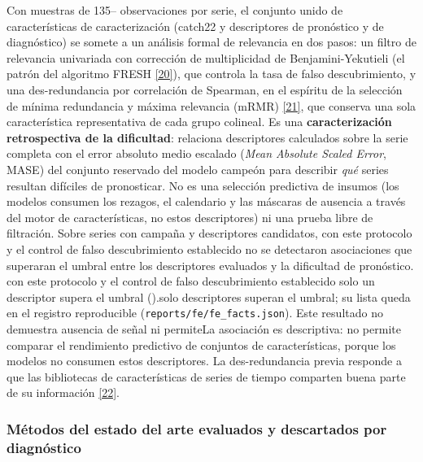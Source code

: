 \documentclass[12pt,letterpaper]{report}
\newcommand{\cita}[1]{\hyperref[bib:#1]{[#1]}}
\begin{document}
Con muestras de 135--\factNMonths{} observaciones por serie, el conjunto unido de
características de caracterización (catch22 y descriptores de pronóstico y de diagnóstico) se
somete a un análisis formal de relevancia en dos pasos: un filtro de relevancia univariada con
corrección de multiplicidad de Benjamini-Yekutieli (el patrón del algoritmo FRESH \cita{20}), que
controla la tasa de falso descubrimiento, y una des-redundancia por correlación de Spearman, en el
espíritu de la selección de mínima redundancia y máxima relevancia (mRMR) \cita{21}, que conserva
una sola característica representativa de cada grupo colineal. Es una \textbf{caracterización
retrospectiva de la dificultad}: relaciona descriptores calculados sobre la serie completa con el
error absoluto medio escalado (\textit{Mean Absolute Scaled Error}, MASE) del conjunto reservado
del modelo campeón para describir \textit{qué} series resultan difíciles de pronosticar. No es una
selección predictiva de insumos (los modelos consumen los rezagos, el calendario y las máscaras de
ausencia a través del motor de características, no estos descriptores) ni una prueba libre de
filtración. Sobre \feFactSelSeries{} series con campaña y \feFactSelIn{} descriptores candidatos,
\ifnum{}
con este protocolo y el control de falso descubrimiento establecido no se detectaron
asociaciones que superaran el umbral entre los descriptores evaluados y la dificultad de
pronóstico.
\else
con este protocolo y el control de falso descubrimiento establecido
\ifnum{} solo un descriptor supera el umbral (\texttt{\feFactSelName}).\else solo
\feFactSelRelevant{} descriptores superan el umbral; su lista queda en el registro reproducible
(\texttt{reports/fe/fe\_facts.json}).\fi{}
\fi
\ifnum{} Este resultado no demuestra ausencia de señal ni permite\else La
asociación es descriptiva: no permite\fi{} comparar el rendimiento predictivo
de conjuntos de características, porque los modelos no consumen estos descriptores. La
des-redundancia previa responde a que las bibliotecas de características de series de
tiempo comparten buena parte de su información \cita{22}.

\subsubsection{Métodos del estado del arte evaluados y descartados por diagnóstico}
\end{document}

